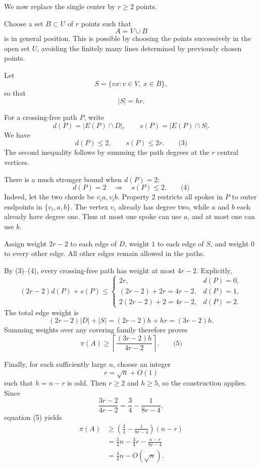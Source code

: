 \documentclass[
  11pt,
  a4paper,
]{article}
\begin{document}
We now replace the single center by \(r\ge2\) points.

Choose a set \(B\subset U\) of \(r\) points such that \[
A=V\cup B
\] is in general position. This is possible by choosing the points
successively in the open set \(U\), avoiding the finitely many lines
determined by previously chosen points.

Let \[
S=\{vx:v\in V,\ x\in B\},
\] so that \[
|S|=hr.
\]

For a crossing-free path \(P\), write \[
d(P)=|E(P)\cap D|,
\qquad
s(P)=|E(P)\cap S|.
\] We have \[
d(P)\le2,\qquad s(P)\le2r. \qquad\text{(3)}
\] The second inequality follows by summing the path degrees at the
\(r\) central vertices.

There is a much stronger bound when \(d(P)=2\): \[
d(P)=2\quad\Longrightarrow\quad s(P)\le2. \qquad\text{(4)}
\] Indeed, let the two chords be \(v_i a,v_i b\). Property 2 restricts
all spokes in \(P\) to outer endpoints in \(\{v_i,a,b\}\). The vertex
\(v_i\) already has degree two, while \(a\) and \(b\) each already have
degree one. Thus at most one spoke can use \(a\), and at most one can
use \(b\).

Assign weight \(2r-2\) to each edge of \(D\), weight \(1\) to each edge
of \(S\), and weight \(0\) to every other edge. All other edges remain
allowed in the paths.

By (3)--(4), every crossing-free path has weight at most \(4r-2\).
Explicitly, \[
(2r-2)d(P)+s(P)\le
\begin{cases}
2r,&d(P)=0,\\
(2r-2)+2r=4r-2,&d(P)=1,\\
2(2r-2)+2=4r-2,&d(P)=2.
\end{cases}
\] The total edge weight is \[
(2r-2)|D|+|S|
=(2r-2)h+hr
=(3r-2)h.
\] Summing weights over any covering family therefore proves \[
\boxed{\displaystyle
\pi(A)\ge
\left\lceil\frac{(3r-2)h}{4r-2}\right\rceil.}
\qquad\text{(5)}
\]

Finally, for each sufficiently large \(n\), choose an integer \[
r=\sqrt n+O(1)
\] such that \(h=n-r\) is odd. Then \(r\ge2\) and \(h\ge5\), so the
construction applies. Since \[
\frac{3r-2}{4r-2}
=\frac34-\frac{1}{8r-4},
\] equation (5) yields \begin{equation*}
\begin{aligned}
\pi(A)
&\ge
\left(\frac34-\frac{1}{8r-4}\right)(n-r)\\
&=
\frac34n-\frac34r-\frac{n-r}{8r-4}\\
&=
\frac34n-O(\sqrt n).
\end{aligned}
\end{equation*}
\end{document}
